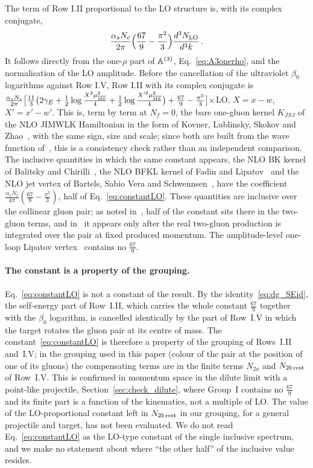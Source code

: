 The term of Row I.II proportional to the LO structure is, with its complex conjugate,
\begin{align}\label{eq:constantLO}
\frac{\alpha_sN_c}{2\pi}\Big(\frac{67}{9}-\frac{\pi^2}{3}\Big)\frac{d^3N_{\rm LO}}{d^3k}\,.
\end{align}
It follows directly from the one-$\rho$ part of $\mathbb{A}^{(3)}$, Eq.~\eqref{eq:A3onerho}, and the normalisation of the LO amplitude. Before the cancellation of the ultraviolet $\beta_0$ logarithms against Row I.V, Row I.II with its complex conjugate is $\frac{\alpha_sN_c}{2\pi}\big[\frac{11}{3}\big(2\gamma_E+\frac12\log\frac{X^2\mu^2_{\overline{\rm MS}}}{4}+\frac12\log\frac{X'^2\mu^2_{\overline{\rm MS}}}{4}\big)+\frac{67}{9}-\frac{\pi^2}{3}\big]\times$LO, $X=x-w$, $X'=x'-w'$. This is, term by term at $N_f=0$, the bare one-gluon kernel $K_{JSJ}$ of the NLO JIMWLK Hamiltonian in the form of Kovner, Lublinsky, Skokov and Zhao~\cite{Kovner:2023vsy}, with the same sign, size and scale; since both are built from the wave function of~\cite{Lublinsky:2016meo}, this is a consistency check rather than an independent comparison. The inclusive quantities in which the same constant appears, the NLO BK kernel of Balitsky and Chirilli~\cite{Balitsky:2007feb}, the NLO BFKL kernel of Fadin and Lipatov~\cite{Fadin:1998py} and the NLO jet vertex of Bartels, Sabio Vera and Schwennsen~\cite{Bartels:2006hg}, have the coefficient $\frac{\alpha_sN_c}{4\pi}(\frac{67}{9}-\frac{\pi^2}{3})$, half of Eq.~\eqref{eq:constantLO}. These quantities are inclusive over the collinear gluon pair; as noted in~\cite{Kovner:2023vsy}, half of the constant sits there in the two-gluon terms, and in~\cite{Fadin:1998py} it appears only after the real two-gluon production is integrated over the pair at fixed produced momentum. The amplitude-level one-loop Lipatov vertex~\cite{DelDuca:1998cx} contains no $\frac{67}{9}$.

\paragraph{The constant is a property of the grouping.} Eq.~\eqref{eq:constantLO} is not a constant of the result. By the identity~\eqref{eq:dg_SEid}, the self-energy part of Row~I.II, which carries the whole constant $\frac{67}{9}$ together with the $\beta_0$ logarithm, is cancelled identically by the part of Row~I.V in which the target rotates the gluon pair at its centre of mass. The constant~\eqref{eq:constantLO} is therefore a property of the grouping of Rows~I.II and~I.V; in the grouping used in this paper (colour of the pair at the position of one of its gluons) the compensating terms are in the finite terms $N_{2a}$ and $N_{2b\,\rm rest}$ of Row~I.V. This is confirmed in momentum space in the dilute limit with a point-like projectile, Section~\ref{sec:check_dilute}, where Group~I contains no $\frac{67}{9}$ and its finite part is a function of the kinematics, not a multiple of LO. The value of the LO-proportional constant left in $N_{2b\,\rm rest}$ in our grouping, for a general projectile and target, has not been evaluated. We do not read Eq.~\eqref{eq:constantLO} as the LO-type constant of the single inclusive spectrum, and we make no statement about where ``the other half'' of the inclusive value resides.

